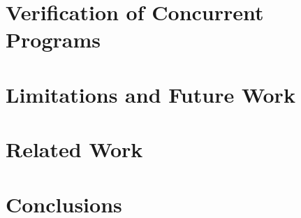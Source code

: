 \documentclass[letterpaper,11pt]{yalephd}
\begin{document}
\chapter{Verification of Concurrent Programs}
\label{chapter:concurrent}


\chapter{Limitations and Future Work}
\label{chapter:limitation}

\chapter{Related Work}
\label{chapter:related}

\chapter{Conclusions}
\label{chapter:conclusion}







%
%
%

\backmatter


\end{document}

